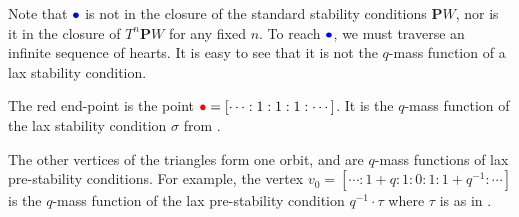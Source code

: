 \documentclass{amsart}
\begin{document}
Note that \(\textcolor{blue}{\bullet}\) is not in the closure of the standard stability conditions \(\mathbf{P}W\), nor is it in the closure of \(T^n \mathbf{P}W\) for any fixed \(n\).
To reach \(\textcolor{blue}{\bullet}\), we must traverse an infinite sequence of hearts.
It is easy to see that it is not the \(q\)-mass function of a lax stability condition.

The red end-point is the point \(\textcolor{red}{\bullet} = [\cdots : 1 : 1 : 1 : \cdots]\).
It is the \(q\)-mass function of the lax stability condition \(\sigma\) from .

The other vertices of the triangles form one orbit, and are \(q\)-mass functions of lax pre-stability conditions.
For example, the vertex \(v_0 = [ \cdots: 1+q : 1 : 0 : 1 : 1+q^{-1} : \cdots ]\) is the \(q\)-mass function of the lax pre-stability condition \(q^{-1} \cdot \tau\) where \(\tau\) is as in .




\end{document}
